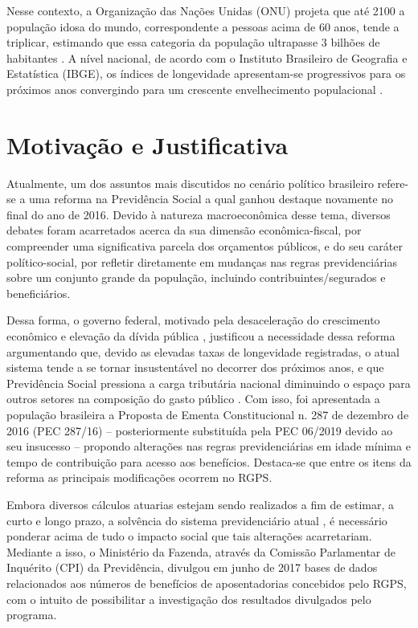Nesse contexto, a Organização das Nações Unidas (ONU) projeta que até 2100 a população idosa do mundo, correspondente a pessoas acima de 60 anos, tende a triplicar, estimando que essa categoria da população ultrapasse 3 bilhões de habitantes \cite{cap05_ref4}. A nível nacional, de acordo com o Instituto Brasileiro de Geografia e Estatística (IBGE), os índices de longevidade apresentam-se progressivos para os próximos anos convergindo para um crescente envelhecimento populacional \cite{cap05_ref5}.

\section{Motivação e Justificativa}

Atualmente, um dos assuntos mais discutidos no cenário político brasileiro refere-se a uma reforma na Previdência Social a qual ganhou destaque novamente no final do ano de 2016. Devido à natureza macroeconômica desse tema, diversos debates foram acarretados acerca da sua dimensão econômica-fiscal, por compreender uma significativa parcela dos orçamentos públicos, e do seu caráter político-social, por refletir diretamente em mudanças nas regras previdenciárias sobre um conjunto grande da população, incluindo contribuintes/segurados e beneficiários. 

Dessa forma, o governo federal, motivado pela desaceleração do crescimento econômico e elevação da dívida pública \cite{cap05_ref6}, justificou a necessidade dessa reforma argumentando que, devido as elevadas taxas de longevidade registradas, o atual sistema tende a se tornar insustentável no decorrer dos próximos anos, e que Previdência Social pressiona a carga tributária nacional diminuindo o espaço para outros setores na composição do gasto público \cite{cap05_ref7}. Com isso, foi apresentada a população brasileira a Proposta de Ementa Constitucional n. 287 de dezembro de 2016 (PEC 287/16) – posteriormente substituída pela PEC 06/2019 devido ao seu insucesso – propondo alterações nas regras previdenciárias em idade mínima e tempo de contribuição para acesso aos benefícios. Destaca-se que entre os itens da reforma as principais modificações ocorrem no RGPS.

Embora diversos cálculos atuarias estejam sendo realizados a fim de estimar, a curto e longo prazo, a solvência do sistema previdenciário atual \cite{cap01_ref1, cap01_ref4}, é necessário ponderar acima de tudo o impacto social que tais alterações acarretariam. Mediante a isso, o Ministério da Fazenda, através da Comissão Parlamentar de Inquérito (CPI) da Previdência, divulgou em junho de 2017 bases de dados relacionados aos números de benefícios de aposentadorias concebidos pelo RGPS, com o intuito de possibilitar a investigação dos resultados divulgados pelo programa.


